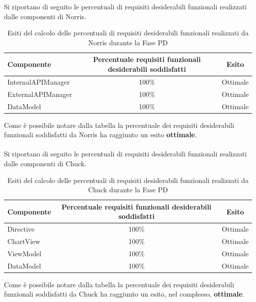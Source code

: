 					Si riportano di seguito le percentuali di requisiti desiderabili funzionali realizzati dalle componenti di Norris.
					\begin{table}[H]
						\centering
							\begin{tabu}{| l | c | c |}
								\hline
								Componente			& 	Percentuale requisiti funzionali desiderabili soddisfatti	& Esito		\\ \hline \hline
								InternalAPIManager	& 	100\% 	& Ottimale  \\ \hline
								ExternalAPIManager  & 	100\%	& Ottimale  \\ \hline
								DataModel  			& 	100\%	& Ottimale  \\ \hline
							\end{tabu}
						\caption{Esiti del calcolo delle percentuali di requisiti desiderabili funzionali realizzati da Norris durante la Fase PD}
					\end{table}
					Come è possibile notare dalla tabella la percentuale dei requisiti desiderabili funzionali soddisfatti da Norris ha raggiunto un esito \textbf{ottimale}. 
					\\ \\
					Si riportano di seguito le percentuali di requisiti desiderabili funzionali realizzati dalle componenti di Chuck.
					\begin{table}[H]
						\centering
							\begin{tabu}{| l | c | c |}
								\hline
								Componente	& Percentuale requisiti funzionali desiderabili soddisfatti	& Esito		\\ \hline \hline
								Directive	&	100\% 	& Ottimale  \\ \hline
								ChartView	& 	100\%	& Ottimale  \\ \hline
								ViewModel	& 	100\%	& Ottimale  \\ \hline
								DataModel	& 	100\%	& Ottimale  	\\ \hline
							\end{tabu}
						\caption{Esiti del calcolo delle percentuali di requisiti desiderabili funzionali realizzati da Chuck durante la Fase PD}
					\end{table}
					Come è possibile notare dalla tabella la percentuale dei requisiti desiderabili funzionali soddisfatti da Chuck ha raggiunto un esito, nel complesso, \textbf{ottimale}.

